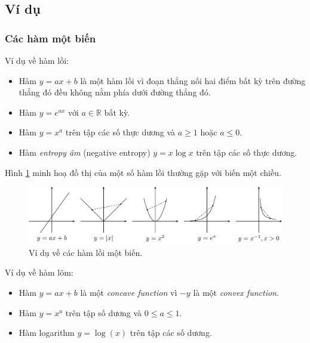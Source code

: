 \subsection{Ví dụ}

\subsubsection{Các hàm một biến}
Ví dụ về hàm lồi:
\begin{itemize}
\item Hàm $ y = ax + b$ là một {hàm lồi} vì đoạn thẳng nối hai điểm
bất kỳ trên đường thẳng đó đều {không nằm phía dưới} đường thẳng đó.

\item Hàm $y = e^{ax}$ với $a \in \mathbb{R}$ bất kỳ.

\item Hàm $y = x^a$ trên tập các số thực dương và $a \geq 1$ hoặc $a \leq 0$.

\item Hàm \textit{entropy âm} (negative entropy) $y = x \log x$ trên tập các số thực dương.

\end{itemize}

Hình \ref{fig:16_convexfunctions} minh hoạ đồ thị của một số hàm lồi thường
gặp với biến một chiều.

\begin{figure}[t]
\myrule
\vspace{3mm}
\centering
\includegraphics[width = \textwidth]{Chapters/08_ConvexOptimization/16_convexity/latex/convexfunctions.pdf}
\caption[]{Ví dụ về các hàm lồi một biến.}
\label{fig:16_convexfunctions}
\captionsetup[figure]{format=rule, justification=centering}
\end{figure}

Ví dụ về hàm lõm:
\begin{itemize}
\item Hàm $y = ax + b$ là một \textit{concave function} vì $-y$ là một \textit{convex function}.

\item Hàm $y = x^a$ trên tập số dương và $0 \leq a \leq 1$.

\item Hàm logarithm $y = \log(x)$ trên tập các số dương.
\end{itemize}

